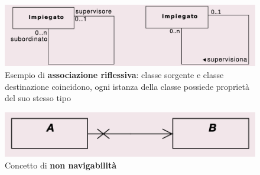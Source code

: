 \vspace{20pt}

\begin{figure}[H]
    \centering
    \includegraphics[width=1\linewidth]{assets/UML/class/class-14.png}
    \caption{Esempio di \textbf{associazione riflessiva}: classe sorgente e classe destinazione coincidono, ogni istanza della classe possiede proprietà del suo stesso tipo}
\end{figure}

\vspace{20pt}

\begin{figure}[H]
    \centering
    \includegraphics[width=1\linewidth]{assets/UML/class/class-15.png}
    \caption{Concetto di \textbf{non navigabilità}}
\end{figure}

\newpage